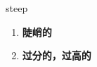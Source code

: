 
\begin{frame}
{\huge steep}
\begin{center}
\begin{enumerate}\Large
  \item \textbf{陡峭的}
  \item \textbf{过分的，过高的}
\end{enumerate}
\end{center}
\end{frame}
